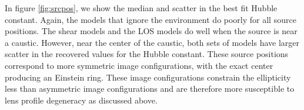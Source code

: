 In figure \ref{fig:srcpos}, we show the median and scatter in the best fit Hubble constant. Again, the models that ignore the environment do poorly for all source positions. The shear models and the LOS models do well when the source is near a caustic. However, near the center of the caustic, both sets of models have larger scatter in the recovered values for the Hubble constant. These source positions correspond to more symmetric image configurations, with the exact center producing an Einstein ring. These image configurations constrain the ellipticity less than asymmetric image configurations and are therefore more susceptible to lens profile degeneracy as discussed above.
